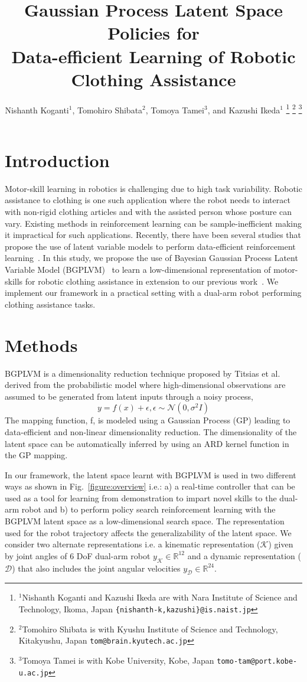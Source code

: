 \documentclass[letterpaper, 10 pt, conference]{ieeeconf}
\title{\LARGE \bf Gaussian Process Latent Space Policies for \\ Data-efficient Learning of Robotic Clothing Assistance}
\author{Nishanth Koganti$^{1}$, Tomohiro Shibata$^{2}$, Tomoya Tamei$^{3}$, and Kazushi Ikeda$^{1}$%
\thanks{$^{1}$Nishanth Koganti and Kazushi Ikeda are with Nara Institute of Science and Technology, Ikoma, Japan
        {\tt\small \{nishanth-k,kazushi\}@is.naist.jp}}%
\thanks{$^{2}$Tomohiro Shibata is with Kyushu Institute of Science and Technology, Kitakyushu, Japan
        {\tt\small tom@brain.kyutech.ac.jp}}%
\thanks{$^{3}$Tomoya Tamei is with Kobe University, Kobe, Japan
        {\tt\small tomo-tam@port.kobe-u.ac.jp}}%
}
\begin{document}
\maketitle
\thispagestyle{empty}
\pagestyle{empty}

\section{Introduction}
Motor-skill learning in robotics is challenging due to high task variability. Robotic assistance to clothing is one such application where the robot needs to interact with non-rigid clothing articles and with the assisted person whose posture can vary. Existing methods in reinforcement learning can be sample-inefficient making it impractical for such applications. Recently, there have been several studies that propose the use of latent variable models to perform data-efficient reinforcement learning~\cite{lrl1, lrl2}. In this study, we propose the use of Bayesian Gaussian Process Latent Variable Model (BGPLVM)~\cite{bgplvm} to learn a low-dimensional representation of motor-skills for robotic clothing assistance in extension to our previous work~\cite{koganti2016}. We implement our framework in a practical setting with a dual-arm robot performing clothing assistance tasks.

\section{Methods}
BGPLVM is a dimensionality reduction technique proposed by Titsias et al.~\cite{bgplvm} derived from the probabilistic model where high-dimensional observations are assumed to be generated from latent inputs through a noisy process,
\begin{equation}
	y = f(x) + \epsilon, \epsilon \sim \mathcal{N}(0,\sigma^2I)
\end{equation}
The mapping function, f, is modeled using a Gaussian Process (GP) leading to data-efficient and non-linear dimensionality reduction. The dimensionality of the latent space can be automatically inferred by using an ARD kernel function in the GP mapping.

In our framework, the latent space learnt with BGPLVM is used in two different ways as shown in Fig.~\ref{figure:overview} i.e.: a) a real-time controller that can be used as a tool for learning from demonstration to impart novel skills to the dual-arm robot and b) to perform policy search reinforcement learning with the BGPLVM latent space as a low-dimensional search space. The representation used for the robot trajectory affects the generalizability of the latent space. We consider two alternate representations i.e. a kinematic representation ($\mathcal{K}$) given by joint angles of 6 DoF dual-arm robot $y_{\mathcal{K}} \in \mathbb{R}^{12}$ and a dynamic representation ($\mathcal{D}$) that also includes the joint angular velocities $y_{\mathcal{D}} \in \mathbb{R}^{24}$.
\end{document}
